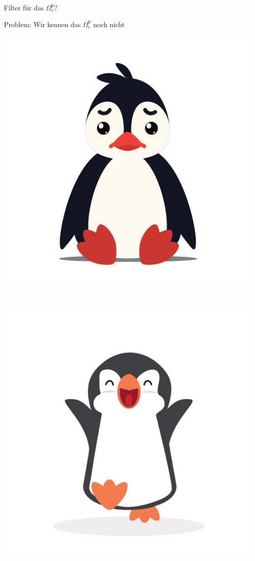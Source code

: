 \begin{frame}{Filter für das $\Omega_c^0$?}
\begin{minipage}[c]{0.75\textwidth}
    Problem: Wir kennen das $\Omega_c^0$ noch nicht \vspace{1cm}
\end{minipage} 
\begin{minipage}[c]{0.2\textwidth}
\centering
    \includegraphics[width=\textwidth]{Figures Lecture on Datanalysis/sad-penguin3.png}
\end{minipage}\\ \pause
\vspace{0.5cm}%
\begin{minipage}[c]{0.2\textwidth}
\centering
    \includegraphics[width=\textwidth]{Figures Lecture on Datanalysis/happy-penguin2.jpeg}

\end{minipage}
\end{frame}
